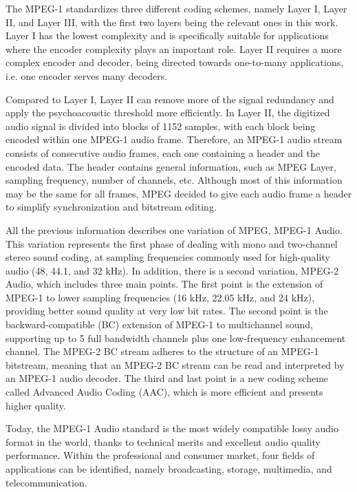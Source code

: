The MPEG-1 standardizes three different coding schemes, namely Layer I, Layer II, and Layer III, with the first two layers being the relevant ones in this work.
Layer I has the lowest complexity and is specifically suitable for applications where the encoder complexity plays an important role.
Layer II requires a more complex encoder and decoder, being directed towards one-to-many applications, i.e. one encoder serves many decoders. 

Compared to Layer I, Layer II can remove more of the signal redundancy and apply the psychoacoustic threshold more efficiently.
In Layer II, the digitized audio signal is divided into blocks of 1152 samples, with each block being encoded within one MPEG-1 audio frame.
Therefore, an MPEG-1 audio stream consists of consecutive audio frames, each one containing a header and the encoded data. The header contains general information, such as MPEG Layer, sampling frequency, number of channels, etc. Although most of this information may be the same for all frames, MPEG decided to give each audio frame a header to simplify synchronization and bitstream editing.

All the previous information describes one variation of MPEG, MPEG-1 Audio. This variation represents the first phase of dealing with mono and two-channel stereo sound coding, at sampling frequencies commonly used for high-quality audio (48, 44.1, and 32 kHz). 
In addition, there is a second variation, MPEG-2 Audio, which includes three main points.
The first point is the extension of MPEG-1 to lower sampling frequencies (16 kHz, 22.05 kHz, and 24 kHz), providing better sound quality at very low bit rates.
The second point is the backward-compatible (BC) extension of MPEG-1 to multichannel sound, supporting up to 5 full bandwidth channels plus one low-frequency enhancement channel. The MPEG-2 BC stream adheres to the structure of an MPEG-1 bitstream, meaning that an MPEG-2 BC stream can be read and interpreted by an MPEG-1 audio decoder.
The third and last point is a new coding scheme called Advanced Audio Coding (AAC), which is more efficient and presents higher quality.
 
Today, the MPEG-1 Audio standard is the most widely compatible lossy audio format in the world, thanks to technical merits and excellent audio quality performance.
Within the professional and consumer market, four fields of applications can be identified, namely broadcasting, storage, multimedia, and telecommunication. %


